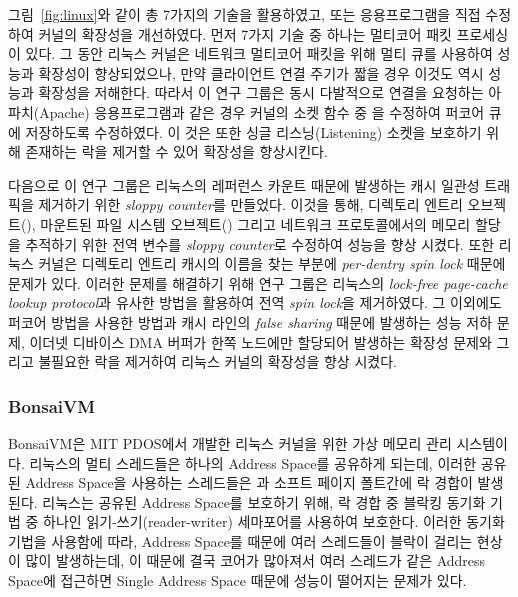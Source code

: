 그림~\ref{fig:linux}와 같이 총 7가지의 기술을 활용하였고, 또는 응용프로그램을 직접 수정하여 
커널의 확장성을 개선하였다.
먼저 7가지 기술 중 하나는 멀티코어 패킷 프로세싱이 있다. 
그 동안 리눅스 커널은 네트워크 멀티코어 패킷을 위해 멀티 큐를 사용하여 성능과 확장성이 향상되었으나, 
만약 클라이언트 연결 주기가 짧을 경우 이것도 역시 성능과 확장성을 저해한다.
따라서 이 연구 그룹은 동시 다발적으로 연결을 요청하는 아파치(Apache) 응용프로그램과 같은 경우 
커널의 소켓 함수 중 을 수정하여 퍼코어 큐에 저장하도록 수정하였다. 
이 것은 또한 싱글 리스닝(Listening) 소켓을 보호하기 위해 존재하는 락을 제거할 수 있어 확장성을 향상시킨다.

다음으로 이 연구 그룹은 리눅스의 레퍼런스 카운트 때문에 발생하는 캐시 일관성 트래픽을 제거하기 위한 
\textit{sloppy counter}를 만들었다. 
이것을 통해, 디렉토리 엔트리 오브젝트(), 마운트된 파일 시스템 오브젝트() 그리고 
네트워크 프로토콜에서의 메모리 할당을 추적하기 위한 전역 변수를 \textit{sloppy counter}로 수정하여 성능을 향상 시켰다. 
또한 리눅스 커널은 디렉토리 엔트리 캐시의 이름을 찾는 부분에 \textit{per-dentry spin lock} 때문에 문제가 있다. 
이러한 문제를 해결하기 위해 연구 그룹은 리눅스의 \textit{lock-free page-cache lookup protocol}과 유사한
방법을 활용하여 전역 \textit{spin lock}을 제거하였다. 
그 이외에도 퍼코어 방법을 사용한 방법과 캐시 라인의 \textit{false sharing} 때문에 발생하는 성능 저하 문제, 
이더넷 디바이스 DMA 버퍼가 한쪽 노드에만 할당되어 발생하는 확장성 문제와 그리고 불필요한 락을 
제거하여 리눅스 커널의 확장성을 향상 시켰다.  

\subsubsection{BonsaiVM}
BonsaiVM은 MIT PDOS에서 개발한 리눅스 커널을 위한 가상 메모리 관리 시스템이다. 
리눅스의 멀티 스레드들은 하나의 Address Space를 공유하게 되는데, 이러한 공유된 Address Space을 사용하는 스레드들은 
과 소프트 페이지 폴트간에 락 경합이 발생된다.
리눅스는 공유된 Address Space를 보호하기 위해, 락 경합 중 블락킹 동기화 기법 중 하나인
읽기-쓰기(reader-writer) 세마포어를 사용하여 보호한다.
이러한 동기화 기법을 사용함에 따라, Address Space를 때문에 여러 스레드들이 블락이 걸리는 현상이 많이 발생하는데, 
이 때문에 결국 코어가 많아져서 여러 스레드가 같은 Address Space에 접근하면 Single Address Space 때문에 성능이
떨어지는 문제가 있다.

